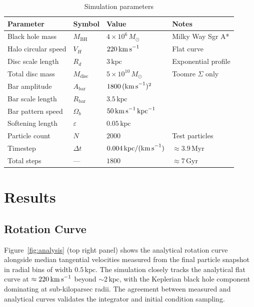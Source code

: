 \documentclass[12pt, letterpaper]{article}
\begin{document}
\begin{table}[H]
\centering
\caption{Simulation parameters}
\begin{tabular}{llll}
\toprule
Parameter & Symbol & Value & Notes \\
\midrule
Black hole mass       & $M_\text{BH}$  & $4\times10^6\,M_\odot$   & Milky Way Sgr A* \\
Halo circular speed   & $V_H$           & $220\,\text{km\,s}^{-1}$ & Flat curve \\
Disc scale length     & $R_d$           & $3\,\text{kpc}$           & Exponential profile \\
Total disc mass       & $M_\text{disc}$ & $5\times10^{10}\,M_\odot$ & Toomre $\Sigma$ only \\
Bar amplitude         & $A_\text{bar}$  & $1800\,\text{(km\,s}^{-1})^2$ & \\
Bar scale length      & $R_\text{bar}$  & $3.5\,\text{kpc}$         & \\
Bar pattern speed     & $\Omega_b$      & $50\,\text{km\,s}^{-1}\,\text{kpc}^{-1}$ & \\
Softening length      & $\varepsilon$   & $0.05\,\text{kpc}$        & \\
Particle count        & $N$             & $2000$                    & Test particles \\
Timestep              & $\Delta t$      & $0.004\,\text{kpc/(km\,s}^{-1})$ & $\approx 3.9\,\text{Myr}$ \\
Total steps           & ---             & $1800$                    & $\approx 7\,\text{Gyr}$ \\
\bottomrule
\end{tabular}
\end{table}

\section{Results}
\label{sec:results}

\subsection{Rotation Curve}

Figure~\ref{fig:analysis} (top right panel) shows the analytical rotation curve alongside median tangential velocities measured from the final particle snapshot in radial bins of width $0.5\,\text{kpc}$. The simulation closely tracks the analytical flat curve at $\approx 220\,\text{km\,s}^{-1}$ beyond $\sim\!2\,\text{kpc}$, with the Keplerian black hole component dominating at sub-kiloparsec radii. The agreement between measured and analytical curves validates the integrator and initial condition sampling.
\end{document}
